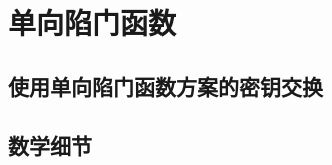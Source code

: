 \section{单向陷门函数}\label{sec:10-2}

\begin{definition}[陷门函数方案]\label{def:10-2}
	
\end{definition}

\begin{game}[单向陷门函数方案]\label{game:10-2}
	
\end{game}

\begin{definition}\label{def:10-3}
	
\end{definition}

\subsection{使用单向陷门函数方案的密钥交换}\label{subsec:10-2-1}

\subsection{数学细节}\label{subsec:10-2-2}

\begin{definition}[陷门函数方案]\label{def:10-4}
	
\end{definition}